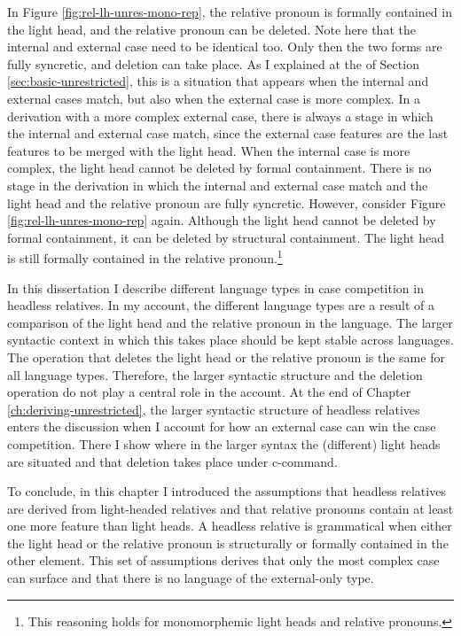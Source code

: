 In Figure \ref{fig:rel-lh-unres-mono-rep}, the relative pronoun is formally contained in the light head, and the relative pronoun can be deleted. Note here that the internal and external case need to be identical too. Only then the two forms are fully syncretic, and deletion can take place.
As I explained at the of Section \ref{sec:basic-unrestricted}, this is a situation that appears when the internal and external cases match, but also when the external case is more complex. In a derivation with a more complex external case, there is always a stage in which the internal and external case match, since the external case features are the last features to be merged with the light head.
When the internal case is more complex, the light head cannot be deleted by formal containment. There is no stage in the derivation in which the internal and external case match and the light head and the relative pronoun are fully syncretic.
However, consider Figure \ref{fig:rel-lh-unres-mono-rep} again.
Although the light head cannot be deleted by formal containment, it can be deleted by structural containment. The light head is still formally contained in the relative pronoun.\footnote{This reasoning holds for monomorphemic light heads and relative pronouns.}

In this dissertation I describe different language types in case competition in headless relatives. In my account, the different language types are a result of a comparison of the light head and the relative pronoun in the language.
The larger syntactic context in which this takes place should be kept stable across languages. The operation that deletes the light head or the relative pronoun is the same for all language types. Therefore, the larger syntactic structure and the deletion operation do not play a central role in the account. At the end of Chapter \ref{ch:deriving-unrestricted}, the larger syntactic structure of headless relatives enters the discussion when I account for how an external case can win the case competition. There I show where in the larger syntax the (different) light heads are situated and that deletion takes place under c-command.

To conclude, in this chapter I introduced the assumptions that headless relatives are derived from light-headed relatives and that relative pronouns contain at least one more feature than light heads. A headless relative is grammatical when either the light head or the relative pronoun is structurally or formally contained in the other element. This set of assumptions derives that only the most complex case can surface and that there is no language of the external-only type.

